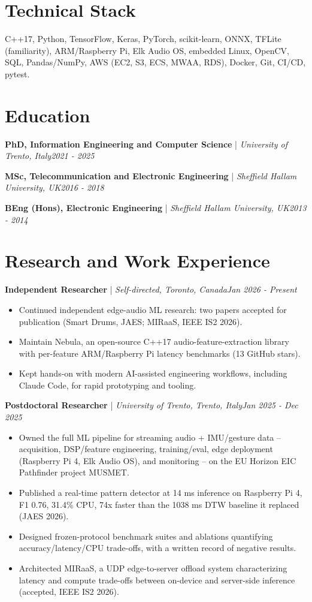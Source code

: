 \documentclass[11pt]{article}
\newenvironment{cvrole}[5]{%
  \par\noindent\textbf{\large #1} | \textit{\small #2, #3}\hfill \textit{\small #4 - #5}\par
  \begin{itemize}[leftmargin=2em, itemsep=-0.3em, topsep=-0.5em]%
}{%
  \end{itemize}\par\noindent\mbox{}\par\vspace{0.1em}%
}
\begin{document}
\section*{Technical Stack}
C++17, Python, TensorFlow, Keras, PyTorch, scikit-learn, ONNX, TFLite (familiarity), ARM/Raspberry Pi, Elk Audio OS, embedded Linux, OpenCV, SQL, Pandas/NumPy, AWS (EC2, S3, ECS, MWAA, RDS), Docker, Git, CI/CD, pytest.

\section*{Education}
\noindent\textbf{PhD, Information Engineering and Computer Science} | \textit{University of Trento, Italy}\hfill \textit{2021 - 2025}\par
\noindent\textbf{MSc, Telecommunication and Electronic Engineering} | \textit{Sheffield Hallam University, UK}\hfill \textit{2016 - 2018}\par
\noindent\textbf{BEng (Hons), Electronic Engineering} | \textit{Sheffield Hallam University, UK}\hfill \textit{2013 - 2014}\par
\vspace{0.3em}

\section*{Research and Work Experience}

\begin{cvrole}{Independent Researcher}{Self-directed}{Toronto, Canada}{Jan 2026}{Present}
\item Continued independent edge-audio ML research: two papers accepted for publication (Smart Drums, JAES; MIRaaS, IEEE IS2 2026).
\item Maintain Nebula, an open-source C++17 audio-feature-extraction library with per-feature ARM/Raspberry Pi latency benchmarks (13 GitHub stars).
\item Kept hands-on with modern AI-assisted engineering workflows, including Claude Code, for rapid prototyping and tooling.
\end{cvrole}

\begin{cvrole}{Postdoctoral Researcher}{University of Trento}{Trento, Italy}{Jan 2025}{Dec 2025}
\item Owned the full ML pipeline for streaming audio + IMU/gesture data -- acquisition, DSP/feature engineering, training/eval, edge deployment (Raspberry Pi 4, Elk Audio OS), and monitoring -- on the EU Horizon EIC Pathfinder project MUSMET.
\item Published a real-time pattern detector at 14 ms inference on Raspberry Pi 4, F1 0.76, 31.4\% CPU, 74x faster than the 1038 ms DTW baseline it replaced (JAES 2026).
\item Designed frozen-protocol benchmark suites and ablations quantifying accuracy/latency/CPU trade-offs, with a written record of negative results.
\item Architected MIRaaS, a UDP edge-to-server offload system characterizing latency and compute trade-offs between on-device and server-side inference (accepted, IEEE IS2 2026).
\end{cvrole}
\end{document}
